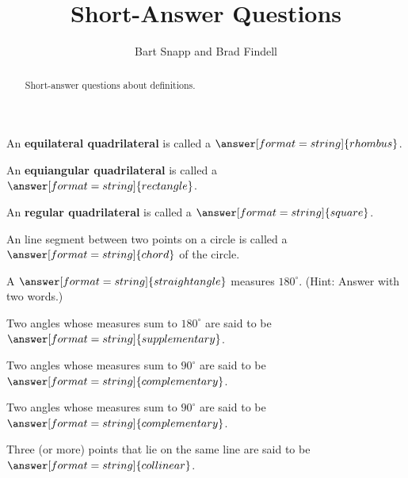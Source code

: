 \documentclass[nooutcomes]{ximera}
\title{Short-Answer Questions}
\author{Bart Snapp and Brad Findell}
\begin{document}
\begin{abstract}
Short-answer questions about definitions. 
\end{abstract}
\maketitle

%


\begin{question}  
An \textbf{equilateral quadrilateral} is called a $\answer[format=string]{rhombus}$.
\end{question}

\begin{question}  
An \textbf{equiangular quadrilateral} is called a $\answer[format=string]{rectangle}$. 
\end{question}

\begin{question}  
An \textbf{regular quadrilateral} is called a $\answer[format=string]{square}$. 
\end{question}

\begin{question}  
An line segment between two points on a circle is called a $\answer[format=string]{chord}$ of the circle.  
\end{question}

\begin{question}  
A $\answer[format=string]{straight angle}$ measures $180^\circ$.  (Hint: Answer with two words.)
\end{question}

\begin{question}  
Two angles whose measures sum to $180^\circ$ are said to be $\answer[format=string]{supplementary}$.  
\end{question}

\begin{question}  
Two angles whose measures sum to $90^\circ$ are said to be $\answer[format=string]{complementary}$.  
\end{question}

\begin{question}  
Two angles whose measures sum to $90^\circ$ are said to be $\answer[format=string]{complementary}$.  
\end{question}

\begin{question}  
Three (or more) points that lie on the same line are said to be $\answer[format=string]{collinear}$.  
\end{question}
\end{document}

